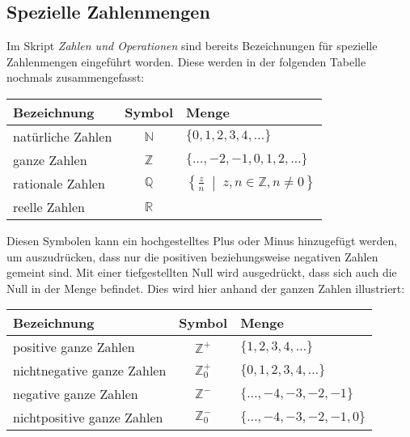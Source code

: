 \subsection{Spezielle Zahlenmengen}
Im Skript \textit{Zahlen und Operationen} sind bereits Bezeichnungen für spezielle Zahlenmengen eingeführt worden. Diese werden in der folgenden Tabelle nochmals zusammengefasst:
\begin{center}
  \renewcommand{\arraystretch}{1.3}
  \begin{tabularx}{0.8\textwidth}{Xcl}
      \textbf{Bezeichnung} & \textbf{Symbol} & \textbf{Menge} \\
    \toprule
      natürliche Zahlen    & $\mathbb{N}$    & $\{0, 1, 2, 3, 4, \ldots\}$ \\
    \midrule
      ganze Zahlen         & $\mathbb{Z}$    & $\{\ldots, -2, -1, 0, 1, 2, \ldots\}$ \\
    \midrule
      rationale Zahlen     & $\mathbb{Q}$    & $\left\{\tfrac{z}{n} \;\middle|\; z,n\in\mathbb{Z}, n\neq 0 \right\} $ \\
    \midrule
      reelle Zahlen        & $\mathbb{R}$    & \\
    \bottomrule
  \end{tabularx}
\end{center}

Diesen Symbolen kann ein hochgestelltes Plus oder Minus hinzugefügt werden, um auszudrücken, dass nur die positiven beziehungsweise negativen Zahlen gemeint sind. Mit einer tiefgestellten Null wird ausgedrückt, dass sich auch die Null in der Menge befindet. Dies wird hier anhand der ganzen Zahlen illustriert:
\begin{center}
  \renewcommand{\arraystretch}{1.3}
  \begin{tabularx}{0.8\textwidth}{Xcl}
      \textbf{Bezeichnung}       & \textbf{Symbol}      & \textbf{Menge} \\
    \toprule
      positive ganze Zahlen      & $\mathbb{Z}^{+}$     & $\{1, 2, 3, 4, \ldots\}$ \\
    \midrule
      nichtnegative ganze Zahlen & $\mathbb{Z}_{0}^{+}$ & $\{0, 1, 2, 3, 4, \ldots\}$ \\
    \midrule
      negative ganze Zahlen      & $\mathbb{Z}^{-}$     & $\{\ldots, -4, -3, -2, -1 \}$ \\
    \midrule
      nichtpositive ganze Zahlen & $\mathbb{Z}_{0}^{-}$ & $\{\ldots, -4, -3, -2, -1, 0 \}$ \\
    \bottomrule
  \end{tabularx}
\end{center}

